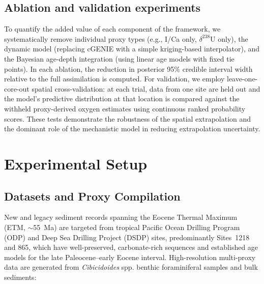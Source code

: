 \documentclass{article}
\begin{document}
\subsection{Ablation and validation experiments}

To quantify the added value of each component of the framework, we systematically remove individual proxy types (e.g., I/Ca only, $\delta^{238}$U only), the dynamic model (replacing cGENIE with a simple kriging-based interpolator), and the Bayesian age-depth integration (using linear age models with fixed tie points). In each ablation, the reduction in posterior 95\% credible interval width relative to the full assimilation is computed. For validation, we employ leave-one-core-out spatial cross-validation: at each trial, data from one site are held out and the model’s predictive distribution at that location is compared against the withheld proxy-derived oxygen estimates using continuous ranked probability scores. These tests demonstrate the robustness of the spatial extrapolation and the dominant role of the mechanistic model in reducing extrapolation uncertainty.

\section{Experimental Setup}

\subsection{Datasets and Proxy Compilation}

New and legacy sediment records spanning the Eocene Thermal Maximum (ETM, $\sim$55~Ma) are targeted from tropical Pacific Ocean Drilling Program (ODP) and Deep Sea Drilling Project (DSDP) sites, predominantly Sites~1218 and 865, which have well-preserved, carbonate-rich sequences and established age models for the late Paleocene--early Eocene interval.
High-resolution multi-proxy data are generated from \textit{Cibicidoides} spp. benthic foraminiferal samples and bulk sediments:
\end{document}
